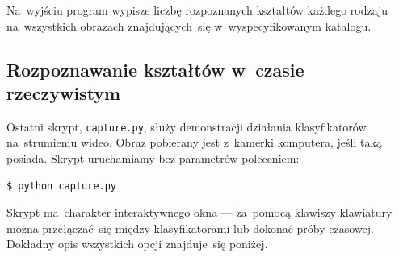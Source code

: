 \documentclass[11pt,a4paper]{article}
\begin{document}
Na~wyjściu program wypisze liczbę rozpoznanych kształtów każdego rodzaju na~wszystkich obrazach znajdujących~się w~wyspecyfikowanym katalogu.

\subsection{Rozpoznawanie kształtów w~czasie rzeczywistym}

Ostatni skrypt, \verb+capture.py+, służy demonstracji działania klasyfikatorów na~strumieniu wideo.
Obraz pobierany jest z~kamerki komputera, jeśli taką posiada.
Skrypt uruchamiamy bez parametrów poleceniem:
\begin{verbatim}
$ python capture.py
\end{verbatim}
Skrypt ma~charakter interaktywnego okna --- za~pomocą klawiszy klawiatury można przełączać~się między klasyfikatorami lub dokonać próby czasowej.
Dokładny opis wszystkich opcji znajduje~się poniżej.
\end{document}
